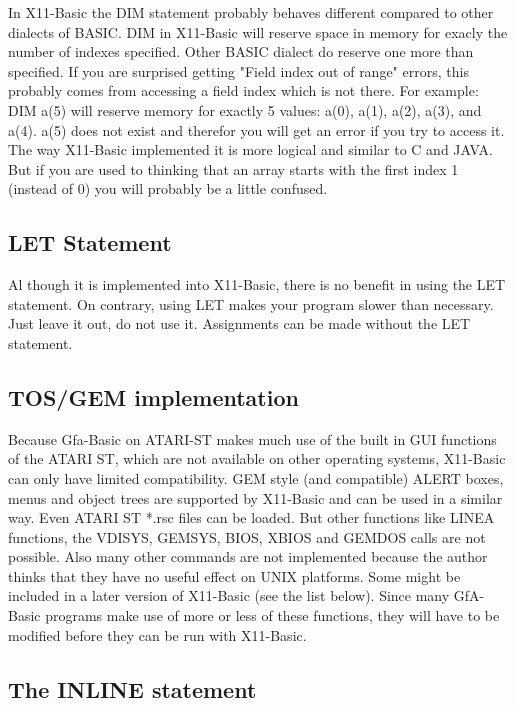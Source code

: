 In X11-Basic the DIM statement probably behaves different compared to other  dialects of
BASIC. DIM in X11-Basic will reserve space in memory for exacly the number of indexes
specified.  Other BASIC dialect do reserve one more than specified. If you are surprised
getting "Field index out of range" errors, this probably comes from accessing a field index
which is not there. For example: DIM a(5) will reserve memory for exactly 5 values: a(0),
a(1), a(2), a(3), and a(4). a(5) does not exist and therefor you will get an error if you try
to access it. The way X11-Basic implemented it is more logical and similar to C and JAVA. But
if you are used to thinking that an array starts with the first index 1 (instead of 0) you
will probably be a little confused.

\subsection*{LET Statement}

Al though it is implemented into X11-Basic, there is no benefit in  using the
LET statement. On contrary, using LET makes your program  slower than necessary.
Just leave it out, do not use it. Assignments can be made without the LET
statement.


\subsection*{TOS/GEM implementation}

Because Gfa-Basic on ATARI-ST makes much use of the built in GUI functions of
the ATARI ST, which are not available on other operating systems, X11-Basic can
only have limited compatibility. GEM style (and compatible) ALERT boxes, menus 
and object trees are supported by X11-Basic and can be used in a similar way.
Even ATARI ST *.rsc files can be loaded. But other functions like LINEA
functions, the VDISYS, GEMSYS, BIOS, XBIOS and GEMDOS calls are not possible.
Also many other commands are not implemented because the author thinks that they
have no useful effect on UNIX platforms. Some might be included in a later
version of X11-Basic (see the list below). Since many GfA-Basic programs make
use of more or less of these functions, they will have to be modified before
they can be run with X11-Basic.

\subsection*{The INLINE statement}

